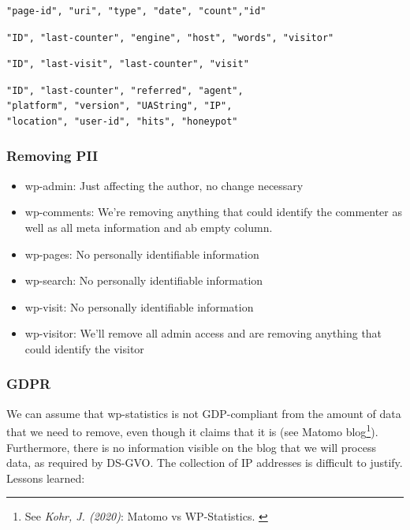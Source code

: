 \begin{lstlisting}[caption=wp-pages, frame=single, basicstyle=\ttfamily]
"page-id", "uri", "type", "date", "count","id"
\end{lstlisting}

\begin{lstlisting}[caption=wp-search, frame=single, basicstyle=\ttfamily]
"ID", "last-counter", "engine", "host", "words", "visitor"
\end{lstlisting}

\begin{lstlisting}[caption=wp-visit, frame=single, basicstyle=\ttfamily]
"ID", "last-visit", "last-counter", "visit"
\end{lstlisting}

\begin{lstlisting}[caption=wp-visitor, frame=single, basicstyle=\ttfamily]
"ID", "last-counter", "referred", "agent", 
"platform", "version", "UAString", "IP", 
"location", "user-id", "hits", "honeypot"
\end{lstlisting}

\subsubsection{Removing PII}

\begin{itemize}
 \item wp-admin: Just affecting the author, no change necessary
 \item wp-comments: We're removing anything that could identify the commenter as well as all meta information and ab empty column.
 \item wp-pages: No personally identifiable information
 \item wp-search: No personally identifiable information
 \item wp-visit: No personally identifiable information
 \item wp-visitor: We'll remove all admin access and are removing anything that could identify the visitor
\end{itemize}

\subsubsection{GDPR}

We can assume that wp-statistics is not GDP-compliant from the amount of data that we need to remove, even though it claims that it is (see Matomo blog\footnote{See \textit{Kohr, J. (2020)}: Matomo vs WP-Statistics. \cite{matomoBlog}}). Furthermore, there is no information visible on the blog that we will process data, as required by DS-GVO. The collection of IP addresses is difficult to justify. Lessons learned:

